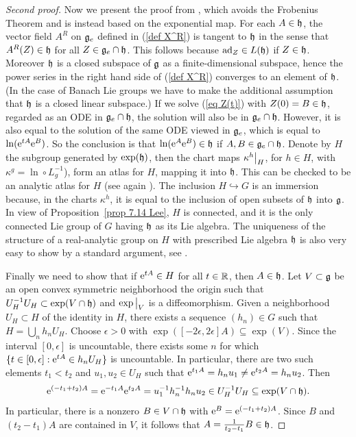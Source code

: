 \begin{proof}[Second proof]
    Now we present the proof from \cite[Thm.~1.10.3]{DK}, which avoids the Frobenius Theorem and is instead based on the exponential map. For each $A\in\mathfrak{h}$, the vector field $A^R$ on $\mathfrak{g}_e$ defined in (\ref{def X^R}) is tangent to $\mathfrak{h}$ in the sense that $A^R(Z)\in\mathfrak{h}$ for all $Z\in\mathfrak{g}_e\cap\mathfrak{h}$. This follows because $\mathrm{ad}_Z\in\boldsymbol{\mathrm{\mathrm}}{L}(\mathfrak{h})$ if $Z\in\mathfrak{h}$. Moreover $\mathfrak{h}$ is a closed subspace of $\mathfrak{g}$ as a finite-dimensional subspace, hence the power series in the right hand side of (\ref{def X^R}) converges to an element of $\mathfrak{h}$. (In the case of Banach Lie groups we have to make the additional assumption that $\mathfrak{h}$ is a closed linear subspace.) If we solve (\ref{eq Z(t)}) with $Z(0)=B\in\mathfrak{h}$, regarded as an ODE in $\mathfrak{g}_e\cap\mathfrak{h}$, the solution will also be in $\mathfrak{g}_e\cap\mathfrak{h}$. However, it is also equal to the solution of the same ODE viewed in $\mathfrak{g}_e$, which is equal to $\ln(\mathrm{e}^{tA}\mathrm{e}^B)$. So the conclusion is that $\ln(\mathrm{e}^A\mathrm{e}^B)\in\mathfrak{h}$ if $A,B\in\mathfrak{g}_e\cap\mathfrak{h}$. Denote by $H$ the subgroup generated by $\exp(\mathfrak{h})$, then the chart maps $\restr{\kappa^h}{H}$, for $h\in H$, with $\kappa^g=\ln\circ L_g^{-1}$), form an atlas for $H$, mapping it into $\mathfrak{h}$. This can be checked to be an analytic atlas for $H$ (see again \cite[Thm.~1.6.3]{DK}). The inclusion $H\hookrightarrow G$ is an immersion because, in the charts $\kappa^h$, it is equal to the inclusion of open subsets of $\mathfrak{h}$ into $\mathfrak{g}$. In view of Proposition~\ref{prop 7.14 Lee}, $H$ is connected, and it is the only connected Lie group of $G$ having $\mathfrak{h}$ as its Lie algebra. The uniqueness of the structure of a real-analytic group on $H$ with prescribed Lie algebra $\mathfrak{h}$ is also very easy to show by a standard argument, see \cite[Prop.~1.6.4]{DK}.

    Finally we need to show that if $\mathrm{e}^{tA}\in H$ for all $t\in\mathbb{R}$, then $A\in\mathfrak{h}$. Let $V\subset\mathfrak{g}$ be an open convex symmetric neighborhood the origin such that $U_H^{-1}U_H\subset \exp(V\cap \mathfrak{h})$ and $\restr{\exp}{V}$ is a diffeomorphism. Given a neighborhood $U_H\subset H$ of the identity in $H$, there exists a sequence $(h_n)\in G$ such that $H=\bigcup_n h_nU_H$. Choose $\epsilon>0$ with $\exp([-2\epsilon,2\epsilon]A)\subseteq \exp(V)$. Since the interval $[0,\epsilon]$ is uncountable, there exists some $n$ for which $\{t\in [0,\epsilon]:\mathrm{e}^{tA}\in h_nU_H\}$ is uncountable. In particular, there are two such elements $t_1<t_2$ and $u_1,u_2\in U_H$ such that $\mathrm{e}^{t_1A}=h_nu_1\neq \mathrm{e}^{t_2A}=h_nu_2$. Then
    \[\mathrm{e}^{(-t_1+t_2)A}=\mathrm{e}^{-t_1A}\mathrm{e}^{t_2A}=u_1^{-1}h_n^{-1}h_nu_2\in U_H^{-1}U_H\subseteq \exp(V\cap\mathfrak{h}).\]
    In particular, there is a nonzero $B\in V\cap\mathfrak{h}$ with $\mathrm{e}^B=\mathrm{e}^{(-t_1+t_2)A}$. Since $B$ and $(t_2-t_1)A$ are contained in $V$, it follows that $A=\frac{1}{t_2-t_1}B\in\mathfrak{h}$.
 \end{proof}




